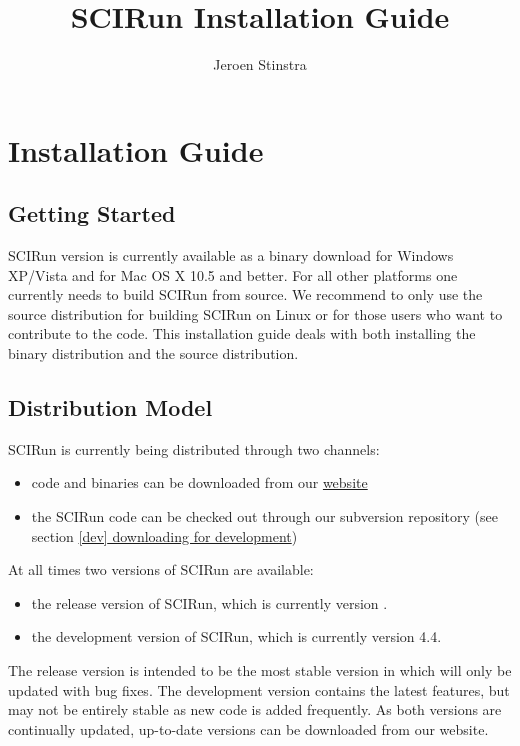 \documentclass[fleqn,12pt,openany]{book}
\title{SCIRun Installation Guide}
\author{Jeroen Stinstra}
\begin{document}
\maketitle


\chapter{Installation Guide}


\section{Getting Started}

SCIRun version \SCIRunVersion is currently available as a binary download for Windows XP/Vista and for Mac OS X 10.5 and better.
For all other platforms one currently needs to build SCIRun from source.
We recommend to only use the source distribution for building SCIRun on Linux or for those users who want to contribute to the code.
This installation guide deals with both installing the binary distribution and the source distribution.

\section{Distribution Model}

SCIRun is currently being distributed through two channels:
\begin{itemize}
\item code and binaries can be downloaded from our \href{http://software.sci.utah.edu}{website}
\item the SCIRun code can be checked out through our subversion repository (see section \hyperref[dev]{\ref{dev} downloading for development})
\end{itemize}

At all times two versions of SCIRun are available:
\begin{itemize}
\item the release version of SCIRun, which is currently version \SCIRunVersion.
\item the development version of SCIRun, which is currently version 4.4.
\end{itemize}

The release version is intended to be the most stable version in which will only be updated with bug fixes.
The development version contains the latest features, but may not be entirely stable as new code is added frequently.
As both versions are continually updated, up-to-date versions can be downloaded from our website. 
\end{document}
